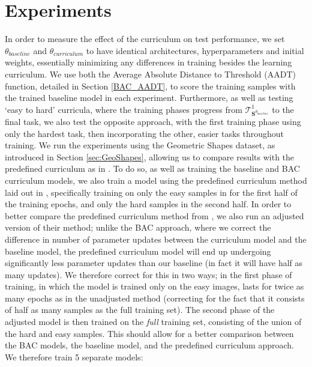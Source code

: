 \section{Experiments}
 In order to measure the effect of the curriculum on test performance, we set $\theta_{baseline}$ and $\theta_{curriculum}$ to have identical architectures, hyperparameters and initial weights, essentially minimizing any differences in training besides the learning curriculum. We use both the Average Absolute Distance to Threshold (AADT) function, detailed in Section \ref{BAC_AADT}, to score the training samples with the trained baseline model in each experiment. Furthermore, as well as testing `easy to hard' curricula, where the training phases progress from  $\mathcal{T}^1_{\mathbf{S}^{\theta_{baseline}}}$ to the final task, we also test the opposite approach, with the first training phase using only the hardest task, then incorporating the other, easier tasks throughout training. We run the experiments using the Geometric Shapes dataset, as introduced in Section \ref{sec:GeoShapes}, allowing us to compare results with the predefined curriculum as in \cite{Bengio2009}. To do so, as well as training the baseline and BAC curriculum models, we also train a model using the predefined curriculum method laid out in \cite{Bengio2009}, specifically training on only the easy samples in for the first half of the training epochs, and only the hard samples in the second half. In order to better compare the predefined curriculum method from \cite{Bengio2009}, we also run an adjusted version of their method; unlike the BAC approach, where we correct the difference in number of parameter updates between the curriculum model and the baseline model, the predefined curriculum model will end up undergoing significantly less parameter updates than our baseline (in fact it will have half as many updates). We therefore correct for this in two ways; in the first phase of training, in which the model is trained only on the easy images, lasts for twice as many epochs as in the unadjusted method (correcting for the fact that it consists of half as many samples as the full training set). The second phase of the adjusted model is then trained on the \textit{full} training set, consisting of the union of the hard and easy samples. This should allow for a better comparison between the BAC models, the baseline model, and the predefined curriculum approach. We therefore train 5 separate models:
